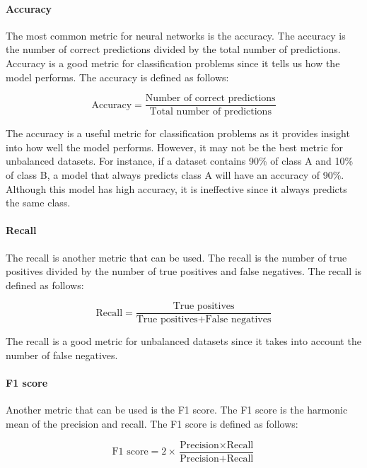 \paragraph{Accuracy}
The most common metric for neural networks is the accuracy. The accuracy is the number of correct predictions divided by the total number of predictions. Accuracy is a good metric for classification problems since it tells us how the model performs. The accuracy is defined as follows:

\begin{equation}
    \text{Accuracy} = \frac{\text{Number of correct predictions}}{\text{Total number of predictions}}
\end{equation}

The accuracy is a useful metric for classification problems as it provides insight into how well the model performs. However, it may not be the best metric for unbalanced datasets. For instance, if a dataset contains 90\% of class A and 10\% of class B, a model that always predicts class A will have an accuracy of 90\%. Although this model has high accuracy, it is ineffective since it always predicts the same class.

\paragraph{Recall}
The recall is another metric that can be used. The recall is the number of true positives divided by the number of true positives and false negatives. The recall is defined as follows:

\begin{equation}
    \text{Recall} = \frac{\text{True positives}}{\text{True positives} + \text{False negatives}}
\end{equation}

The recall is a good metric for unbalanced datasets since it takes into account the number of false negatives.

\paragraph*{F1 score}
Another metric that can be used is the F1 score. The F1 score is the harmonic mean of the precision and recall. The F1 score is defined as follows:

\begin{equation}
    \text{F1 score} = 2 \times \frac{\text{Precision} \times \text{Recall}}{\text{Precision} + \text{Recall}}
\end{equation}

